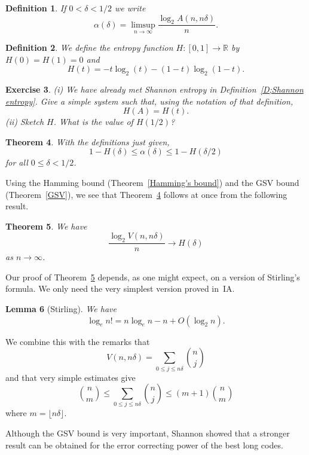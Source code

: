 \documentclass[12pt,a4paper]{article}
\theoremstyle{plain}
\newtheorem{theorem}{Theorem}[section]
\newtheorem{lemma}[theorem]{Lemma}
\newtheorem{definition}[theorem]{Definition}
\newtheorem{exercise}[theorem]{Exercise}
\theoremstyle{definition}
\begin{document}
    \begin{definition}
        If $0<\delta<1/2$ we write
        \[\alpha(\delta)=\limsup_{n\rightarrow\infty}
        \frac{\log_{2} A(n,n\delta)}{n}.\]
    \end{definition}
    \begin{definition}
        We define the entropy
        function $H:[0,1]\rightarrow{\mathbb R}$
        by $H(0)=H(1)=0$ and
        \[H(t)=-t\log_{2}(t)-(1-t)\log_{2}(1-t).\]
    \end{definition}
    \begin{exercise}
        (i) We have already met
        Shannon entropy in Definition~\ref{D;Shannon entropy}.
        Give a simple system such that, using the notation
        of that definition,
        \[H(A)=H(t).\]
        (ii) Sketch $H$. What is the value of $H(1/2)$?
    \end{exercise}
    \begin{theorem}
        \label{T;alpha}
        With the definitions just given,
        \[1-H(\delta)\leq\alpha(\delta)\leq 1-H(\delta/2)\]
        for all $0\leq \delta<1/2$.
    \end{theorem}
    Using the Hamming bound (Theorem~\ref{Hamming's bound})
    and the GSV bound (Theorem~\ref{GSV}), we see that
    Theorem~\ref{T;alpha} follows at once from the
    following result.
    \begin{theorem}
        \label{log volume} We have
        \[\frac{\log_{2}V(n,n\delta)}{n}
        \rightarrow H(\delta)\]
        as $n\rightarrow\infty$.
    \end{theorem}
    Our proof of Theorem~\ref{log volume} depends, as
    one might expect, on a version of Stirling's formula.
    We only need the very simplest version proved
    in~IA.
    \begin{lemma}[Stirling]
        We have
        \[\log_{e} n!=n\log_{e}n-n+O(\log_{2}n).\]
    \end{lemma}
    We combine this with the remarks that
    \[V(n,n\delta)=\sum_{0\leq j\leq n\delta}
    \binom{n}{j}\]
    and that very simple estimates give
    \[\binom{n}{m}\leq \sum_{0\leq j\leq n\delta}
    \binom{n}{j}
    \leq (m+1)\binom{n}{m}\]
    where $m=\lfloor n\delta\rfloor$.

    Although the GSV bound is very important,
    Shannon showed that
    a stronger result can be obtained for the
    error correcting power of the best long codes.
\end{document}
